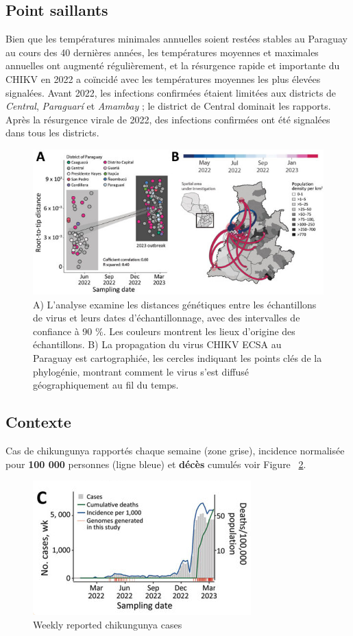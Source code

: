 \subsection{Point saillants}
Bien que les températures minimales annuelles soient restées stables au Paraguay au cours des 40 dernières années, les températures moyennes et maximales annuelles ont augmenté régulièrement, et la résurgence rapide et importante du CHIKV en 2022 a coïncidé avec les températures moyennes les plus élevées signalées. Avant 2022, les infections confirmées étaient limitées aux districts de \textit{Central}, \textit{Paraguarí} et \textit{Amambay} ; le district de Central dominait les rapports. Après la résurgence virale de 2022, des infections confirmées ont été signalées dans tous les districts.
\begin{figure}[h!]
	\centering
	\includegraphics[width=0.6\linewidth]{images/paraguay_region_cases}
	\caption[Expansion of the chikungunya East/Central/South/African lineage epidemic in Paraguay]{A) L'analyse examine les distances génétiques entre les échantillons de virus et leurs dates d'échantillonnage, avec des intervalles de confiance à 90 \%. Les couleurs montrent les lieux d'origine des échantillons. B) La propagation du virus CHIKV ECSA au Paraguay est cartographiée, les cercles indiquant les points clés de la phylogénie, montrant comment le virus s'est diffusé géographiquement au fil du temps.}
	\label{fig:paraguayregioncases}
\end{figure}
\subsection{Contexte}
Cas de chikungunya rapportés chaque semaine (zone grise), incidence normalisée pour \textbf{100 000} personnes (ligne bleue) et \textbf{décès} cumulés voir Figure ~\ref{fig:paraguaycases}.
\begin{figure}[h!]
	\centering
	\includegraphics[width=0.6\linewidth]{images/paraguay_cases}
	\caption{Weekly reported chikungunya cases}
	\label{fig:paraguaycases}
\end{figure}